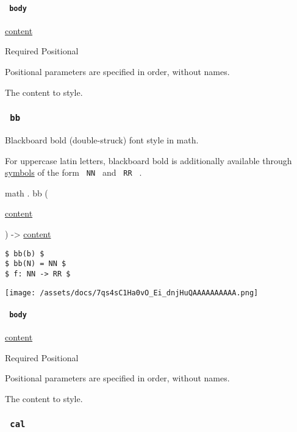 \paragraph{\texorpdfstring{\texttt{\ body\ }}{ body }}\label{functions-mono-body}

\href{/docs/reference/foundations/content/}{content}

{Required} {{ Positional }}

\label{functions-mono-body-positional-tooltip}
Positional parameters are specified in order, without names.

The content to style.

\subsubsection{\texorpdfstring{\texttt{\ bb\ }}{ bb }}\label{functions-bb}

Blackboard bold (double-struck) font style in math.

For uppercase latin letters, blackboard bold is additionally available
through \href{/docs/reference/symbols/sym/}{symbols} of the form
\texttt{\ NN\ } and \texttt{\ RR\ } .

math { . } { bb } (

{ \href{/docs/reference/foundations/content/}{content} }

) -\textgreater{} \href{/docs/reference/foundations/content/}{content}

\begin{verbatim}
$ bb(b) $
$ bb(N) = NN $
$ f: NN -> RR $
\end{verbatim}

\texttt{[image: /assets/docs/7qs4sC1Ha0vO\_Ei\_dnjHuQAAAAAAAAAA.png]}

\paragraph{\texorpdfstring{\texttt{\ body\ }}{ body }}\label{functions-bb-body}

\href{/docs/reference/foundations/content/}{content}

{Required} {{ Positional }}

\label{functions-bb-body-positional-tooltip}
Positional parameters are specified in order, without names.

The content to style.

\subsubsection{\texorpdfstring{\texttt{\ cal\ }}{ cal }}\label{functions-cal}

